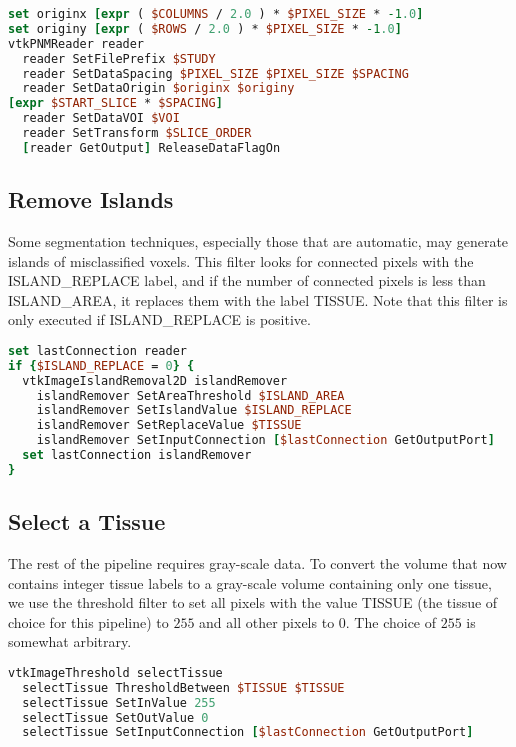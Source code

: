 \begin{lstlisting}[language=TCL, caption={Read the Segmented Volume Data.}]
set originx [expr ( $COLUMNS / 2.0 ) * $PIXEL_SIZE * -1.0]
set originy [expr ( $ROWS / 2.0 ) * $PIXEL_SIZE * -1.0]
vtkPNMReader reader
  reader SetFilePrefix $STUDY
  reader SetDataSpacing $PIXEL_SIZE $PIXEL_SIZE $SPACING
  reader SetDataOrigin $originx $originy
[expr $START_SLICE * $SPACING]
  reader SetDataVOI $VOI
  reader SetTransform $SLICE_ORDER
  [reader GetOutput] ReleaseDataFlagOn
\end{lstlisting}

\subsection{Remove Islands}

Some segmentation techniques, especially those that are automatic, may generate islands of misclassified voxels. This filter looks for connected pixels with the ISLAND\_REPLACE label, and if the number of connected pixels is less than ISLAND\_AREA, it replaces them with the label TISSUE. Note that this filter is only executed if ISLAND\_REPLACE is positive.

\begin{lstlisting}[language=TCL, caption={Remove Islands.}]
set lastConnection reader
if {$ISLAND_REPLACE = 0} {
  vtkImageIslandRemoval2D islandRemover
    islandRemover SetAreaThreshold $ISLAND_AREA
    islandRemover SetIslandValue $ISLAND_REPLACE
    islandRemover SetReplaceValue $TISSUE
    islandRemover SetInputConnection [$lastConnection GetOutputPort]
  set lastConnection islandRemover
}
\end{lstlisting}

\subsection{Select a Tissue}

The rest of the pipeline requires gray-scale data. To convert the volume that now contains integer tissue labels to a gray-scale volume containing only one tissue, we use the threshold filter to set all pixels with the value TISSUE (the tissue of choice for this pipeline) to $255$ and all other pixels to $0$. The choice of $255$ is somewhat arbitrary.

\begin{lstlisting}[language=TCL, caption={Select a Tissue.}]
vtkImageThreshold selectTissue
  selectTissue ThresholdBetween $TISSUE $TISSUE
  selectTissue SetInValue 255
  selectTissue SetOutValue 0
  selectTissue SetInputConnection [$lastConnection GetOutputPort]
\end{lstlisting}

